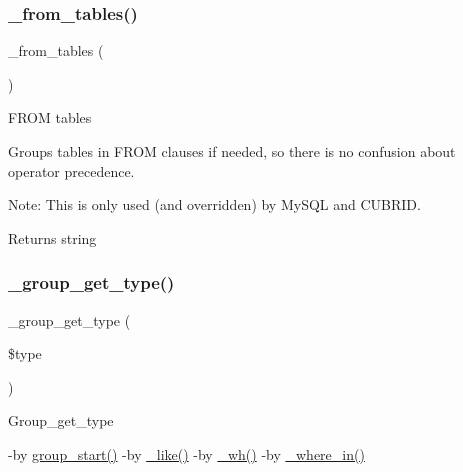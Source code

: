 \subsubsection{\texorpdfstring{\+\_\+from\+\_\+tables()}{\_from\_tables()}}
{\footnotesize\ttfamily \+\_\+from\+\_\+tables (\begin{DoxyParamCaption}{ }\end{DoxyParamCaption})\hspace{0.3cm}{\ttfamily [protected]}}

F\+R\+OM tables

Groups tables in F\+R\+OM clauses if needed, so there is no confusion about operator precedence.

Note\+: This is only used (and overridden) by My\+S\+QL and C\+U\+B\+R\+ID.

\begin{DoxyReturn}{Returns}
string 
\end{DoxyReturn}
\mbox{\label{class_c_i___d_b__query__builder_a0101619da9c48cfa269730ace38a774a}} 
\subsubsection{\texorpdfstring{\+\_\+group\+\_\+get\+\_\+type()}{\_group\_get\_type()}}
{\footnotesize\ttfamily \+\_\+group\+\_\+get\+\_\+type (\begin{DoxyParamCaption}\item[{}]{\$type }\end{DoxyParamCaption})\hspace{0.3cm}{\ttfamily [protected]}}

Group\+\_\+get\+\_\+type

-\/by \mbox{\hyperlink{class_c_i___d_b__query__builder_a0ad001f7f7d1a41fdee4a85b4f7db9b4}{group\+\_\+start()}} -\/by \mbox{\hyperlink{class_c_i___d_b__query__builder_abe8f3477d4b15bf422fc52ba753056b5}{\+\_\+like()}} -\/by \mbox{\hyperlink{class_c_i___d_b__query__builder_a616af9ae6c40b3fe7074a8517207934f}{\+\_\+wh()}} -\/by \mbox{\hyperlink{class_c_i___d_b__query__builder_a768333bb814b0e99783117da4b51f097}{\+\_\+where\+\_\+in()}}


